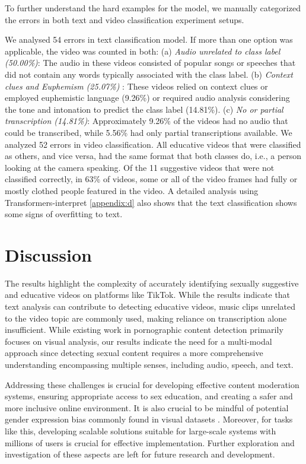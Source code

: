 \documentclass[11pt]{article}
\begin{document}
To further understand the hard examples for the model, we manually categorized the errors in both text and video classification experiment setups. 

We analysed 54 errors in text classification model. If more than one option was applicable, the video was counted in both: (a) {\em Audio unrelated to class label (50.00\%)}: The audio in these videos consisted of popular songs or speeches that did not contain any words typically associated with the class label. (b) {\em Context clues and Euphemism (25.07\%) }: These videos relied on context clues or employed euphemistic language (9.26\%) or required audio analysis considering the tone and intonation to predict the class label (14.81\%). (c) {\em No or partial transcription (14.81\%)}: Approximately 9.26\% of the videos had no audio that could be transcribed, while 5.56\% had only partial transcriptions available. 
We analyzed 52 errors in video classification. All educative videos that were classified as others, and vice versa, had the same format that both classes do, i.e., a person looking at the camera speaking. Of the 11 suggestive videos that were not classified correctly, in 63\%  of videos, some or all of the video frames had fully or mostly clothed people featured in the video.  A detailed analysis using Transformers-interpret \ref{appendix:d} \cite{Pierse_Transformers_Interpret_2021} also shows that the text classification shows some signs of overfitting to text. 

\section{Discussion}

The results highlight the complexity of accurately identifying sexually suggestive and educative videos on platforms like TikTok. While the results indicate that text analysis can contribute to detecting educative videos, music clips unrelated to the video topic are commonly used, making reliance on transcription alone insufficient. While existing work in pornographic content detection primarily focuses on visual analysis, our results indicate the need for a multi-modal approach since detecting sexual content requires  a more comprehensive understanding encompassing  multiple senses, including audio, speech, and text. 

Addressing these challenges is crucial for developing effective content moderation systems, ensuring appropriate access to sex education, and creating a safer and more inclusive online environment. It is also crucial to be mindful of potential gender expression bias commonly found in visual datasets \cite{meister2022gender}. Moreover, for tasks like this, developing scalable solutions suitable for large-scale systems with millions of users is crucial for effective implementation. Further exploration and investigation of these aspects are left for future research and development.
\end{document}
